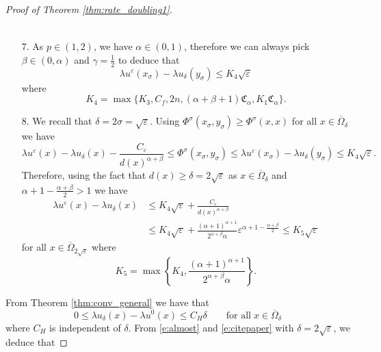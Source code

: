 \documentclass[11pt,reqno]{amsart}
\numberwithin{figure}{section}
\theoremstyle{plain}
\theoremstyle{remark}
\numberwithin{equation}{section}
\begin{document}
\begin{proof}[Proof of Theorem \ref{thm:rate_doubling1}]
\begin{enumerate}
\begin{align*}
\end{align*}
\item[7.] As $p\in (1,2)$, we have $\alpha\in (0,1)$, therefore we can always pick $\beta \in (0,\alpha)$ and $\gamma = \frac{1}{2}$ to deduce that 
\begin{equation*}
     \lambda u^\varepsilon(x_\sigma) - \lambda u_\delta(y_\sigma) \leq K_4 \sqrt{\varepsilon}
\end{equation*}
where 
\begin{equation*}
    K_4 = \max\big\lbrace K_3,C_f,2n, (\alpha+\beta+1)\mathfrak{C}_\alpha, K_1\mathfrak{C}_\alpha \big\rbrace.   
\end{equation*}
\item[8.] We recall that $\delta = 2\sigma = \sqrt{\varepsilon}$. Using $\Phi^\sigma(x_\sigma,y_\sigma)\geq \Phi^\sigma(x,x)$ for all $x\in \overline{\Omega}_\delta$ we have
\begin{equation*}
    \lambda u^\varepsilon(x) - \lambda u_\delta(x) - \frac{C_\varepsilon}{d(x)^{\alpha+\beta}} \leq \Phi^\sigma(x_\sigma,y_\sigma) \leq \lambda u^\varepsilon(x_\sigma) - \lambda u_\delta(y_\sigma) \leq K_4\sqrt{\varepsilon}.
\end{equation*}
Therefore, using the fact that $d(x)\geq \delta = 2\sqrt{\varepsilon}$ as $x\in \overline{\Omega}_\delta$ and $\alpha+1 - \frac{\alpha+\beta}{2} > 1$ we have
\begin{align}
    \lambda u^\varepsilon(x) - \lambda u_\delta(x) &\leq K_4\sqrt{\varepsilon} + \frac{C_\varepsilon}{d(x)^{\alpha+\beta}}\nonumber \\
    &\leq K_4\sqrt{\varepsilon} + \frac{(\alpha+1)^{\alpha+1}}{2^{\alpha+\beta}\alpha}\varepsilon^{\alpha+1 - \frac{\alpha+\beta}{2}}\leq K_5 \sqrt{\varepsilon}\label{e:almost}
\end{align}
for all $x\in \overline{\Omega}_{2\sqrt{\varepsilon}}$ where
\begin{equation*}
    K_5 = \max\left\lbrace K_4, \frac{(\alpha+1)^{\alpha+1}}{2^{\alpha+\beta}\alpha}\right\rbrace.
\end{equation*}
\end{enumerate}
From Theorem \ref{thm:conv_general} we have that
\begin{equation}\label{e:citepaper}
    0\leq \lambda u_\delta(x) - \lambda u^0(x)\leq C_H\delta \qquad\text{for all}\; x\in \overline{\Omega}_\delta
\end{equation}
where $C_H$ is independent of $\delta$. From \eqref{e:almost} and \eqref{e:citepaper} with $\delta = 2\sqrt{\varepsilon}$, we deduce that

\end{proof}
\end{document}
